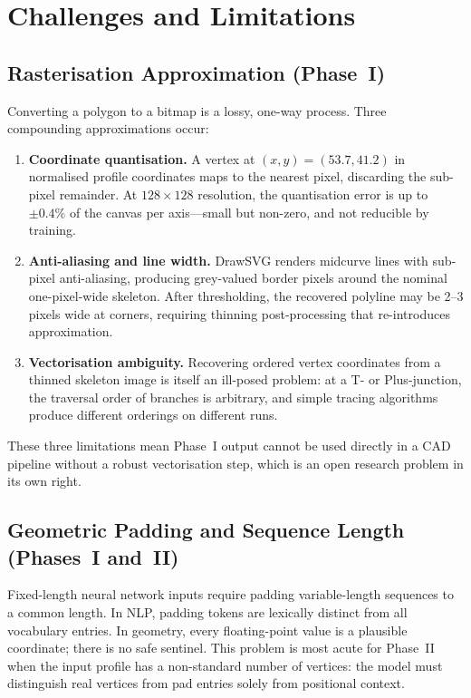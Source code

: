 \documentclass[journal]{IEEEtran}
\begin{document}
\section{Challenges and Limitations}
\label{sec:challenges}

\subsection{Rasterisation Approximation (Phase~I)}

Converting a polygon to a bitmap is a lossy, one-way process.  Three
compounding approximations occur:

\begin{enumerate}
  \item \textbf{Coordinate quantisation.}  A vertex at $(x, y) = (53.7, 41.2)$
        in normalised profile coordinates maps to the nearest pixel, discarding
        the sub-pixel remainder.  At $128 \times 128$ resolution, the
        quantisation error is up to $\pm 0.4\%$ of the canvas per axis—small
        but non-zero, and not reducible by training.

  \item \textbf{Anti-aliasing and line width.}  DrawSVG renders midcurve lines
        with sub-pixel anti-aliasing, producing grey-valued border pixels
        around the nominal one-pixel-wide skeleton.  After thresholding, the
        recovered polyline may be 2--3 pixels wide at corners, requiring
        thinning post-processing that re-introduces approximation.

  \item \textbf{Vectorisation ambiguity.}  Recovering ordered vertex
        coordinates from a thinned skeleton image is itself an ill-posed
        problem: at a T- or Plus-junction, the traversal order of branches is
        arbitrary, and simple tracing algorithms produce different orderings on
        different runs.
\end{enumerate}

These three limitations mean Phase~I output cannot be used directly in a CAD
pipeline without a robust vectorisation step, which is an open research problem
in its own right.

\subsection{Geometric Padding and Sequence Length (Phases~I and~II)}

Fixed-length neural network inputs require padding variable-length sequences to
a common length.  In NLP, padding tokens are lexically distinct from all
vocabulary entries.  In geometry, every floating-point value is a plausible
coordinate; there is no safe sentinel.  This problem is most acute for
Phase~II when the input profile has a non-standard number of vertices: the
model must distinguish real vertices from pad entries solely from positional
context.
\end{document}
